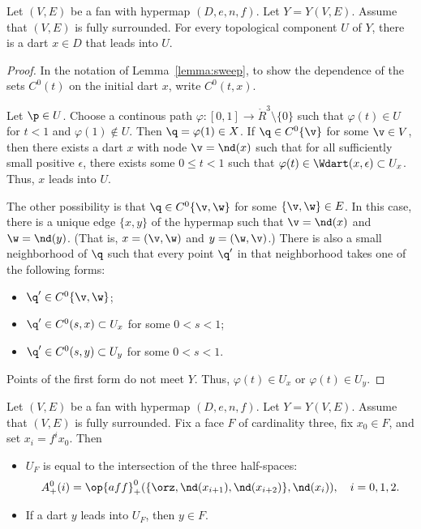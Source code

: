 \begin{lemma}[]\label{lemma:lead-exists}
Let $(V,E)$ be a fan with hypermap $(D,e,n,f)$. Let
$Y=Y(V,E)$. Assume that $(V,E)$ is fully surrounded.  For every
topological component $U$ of $Y$, there is a dart $x\in D$ that
leads into $U$.
\end{lemma}
%
%
%

\begin{proof}  
In the notation of Lemma~\ref{lemma:sweep}, to show the dependence
of the sets $C^0(t)$ on the initial dart $x$, write $C^0(t,x)$.

Let $\p\in U$.  Choose a continous path $\varphi:[0,1]\to
\ring{R}^3\setminus\{0\}$ such that $\varphi(t)\in U$ for $t<1$ and
$\varphi(1)\not\in U$.  Then $\q=\varphi(1)\in X$.  If $\q\in
C^0\{\v\}$ for some $\v\in V$, then there exists a dart $x$ with
node $\v = \nd(x)$ such that for all sufficiently small positive
$\epsilon$, there exists some $0\le t < 1$ such that $\varphi(t)\in
\Wdart(x,\epsilon)\subset U_x$.  Thus, $x$ leads into $U$.
%

The other possibility is that $\q\in C^0\{\v,\w\}$ for some
$\{\v,\w\}\in E$.  In this case, there is a unique edge $\{x,y\}$ of
the hypermap such that $\v=\nd(x)$ and $\w=\nd(y)$.  (That is,
$x=(\v,\w)$ and $y=(\w,\v)$.)  There is also a small neighborhood of
$\q$ such that every point $\q'$ in that neighborhood takes one of
the following forms:
\begin{itemize} \item $\q'\in C^0\{\v,\w\}$;
\item $\q'\in C^0(s,x)\subset U_x$ for some $0<s<1$;
\item $\q'\in C^0(s,y)\subset U_y$ for some $0<s<1$.
\end{itemize}
Points of the first form do not meet $Y$.  Thus, $\varphi(t)\in U_x$
or $\varphi(t)\in U_y$.
\end{proof}

\begin{lemma} \label{lemma:triangle}
Let $(V,E)$ be a fan with hypermap $(D,e,n,f)$.  Let $Y=Y(V,E)$.
Assume that $(V,E)$ is fully surrounded. Fix a face $F$ of
cardinality three, fix $x_0\in F$, and set $x_i = f^i x_0$. Then
%
\begin{itemize}  
\item $U_F$ is equal to the intersection of the three half-spaces:
\begin{displaymath}A^0_+(i)=\op{aff}_+^0(\{\orz,\nd(x_{i+1}),\nd(x_{i+2})\},\nd(x_i)),\quad
i=0,1,2.\end{displaymath}
\item If a dart $y$ leads into $U_F$, then $y\in F$.
\end{itemize}
\end{lemma}
%

